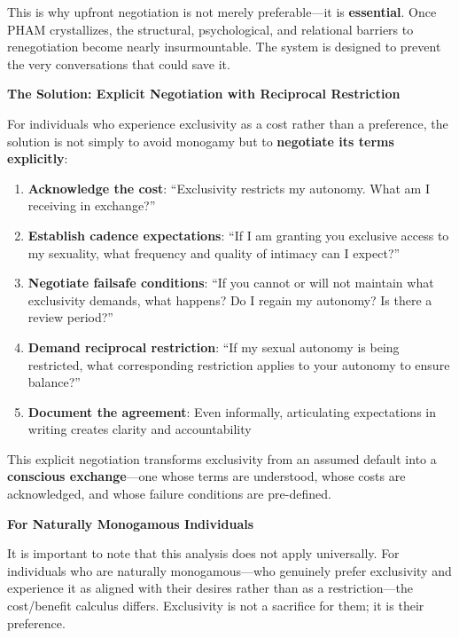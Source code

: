 \documentclass[12pt,openany]{book}
\numberwithin{equation}{chapter}
\begin{document}
This is why upfront negotiation is not merely preferable---it is \textbf{essential}. Once PHAM crystallizes, the structural, psychological, and relational barriers to renegotiation become nearly insurmountable. The system is designed to prevent the very conversations that could save it.

\textbf{The Solution: Explicit Negotiation with Reciprocal Restriction}

For individuals who experience exclusivity as a cost rather than a preference, the solution is not simply to avoid monogamy but to \textbf{negotiate its terms explicitly}:

\begin{enumerate}
    \item \textbf{Acknowledge the cost}: ``Exclusivity restricts my autonomy. What am I receiving in exchange?''
    
    \item \textbf{Establish cadence expectations}: ``If I am granting you exclusive access to my sexuality, what frequency and quality of intimacy can I expect?''
    
    \item \textbf{Negotiate failsafe conditions}: ``If you cannot or will not maintain what exclusivity demands, what happens? Do I regain my autonomy? Is there a review period?''
    
    \item \textbf{Demand reciprocal restriction}: ``If my sexual autonomy is being restricted, what corresponding restriction applies to your autonomy to ensure balance?''
    
    \item \textbf{Document the agreement}: Even informally, articulating expectations in writing creates clarity and accountability
\end{enumerate}

This explicit negotiation transforms exclusivity from an assumed default into a \textbf{conscious exchange}---one whose terms are understood, whose costs are acknowledged, and whose failure conditions are pre-defined.

\textbf{For Naturally Monogamous Individuals}

It is important to note that this analysis does not apply universally. For individuals who are naturally monogamous---who genuinely prefer exclusivity and experience it as aligned with their desires rather than as a restriction---the cost/benefit calculus differs. Exclusivity is not a sacrifice for them; it is their preference.
\end{document}
